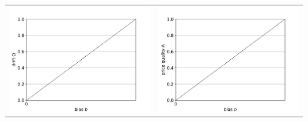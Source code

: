 \documentclass{article}
\begin{document}
\begin{tabular}{cc}
	\includegraphics[scale=.5]{bias_drift} & \includegraphics[scale=.5]{bias_price_quality} \\

\end{tabular}
\end{document}

